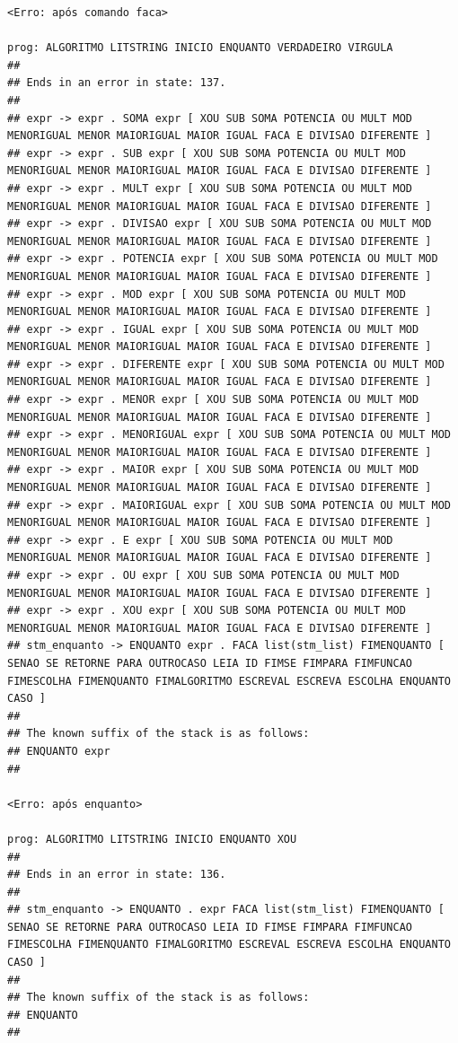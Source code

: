 \documentclass[hidelinks,12pt]{article}
\begin{document}
\begin{lstlisting}
<Erro: após comando faca>

prog: ALGORITMO LITSTRING INICIO ENQUANTO VERDADEIRO VIRGULA 
##
## Ends in an error in state: 137.
##
## expr -> expr . SOMA expr [ XOU SUB SOMA POTENCIA OU MULT MOD MENORIGUAL MENOR MAIORIGUAL MAIOR IGUAL FACA E DIVISAO DIFERENTE ]
## expr -> expr . SUB expr [ XOU SUB SOMA POTENCIA OU MULT MOD MENORIGUAL MENOR MAIORIGUAL MAIOR IGUAL FACA E DIVISAO DIFERENTE ]
## expr -> expr . MULT expr [ XOU SUB SOMA POTENCIA OU MULT MOD MENORIGUAL MENOR MAIORIGUAL MAIOR IGUAL FACA E DIVISAO DIFERENTE ]
## expr -> expr . DIVISAO expr [ XOU SUB SOMA POTENCIA OU MULT MOD MENORIGUAL MENOR MAIORIGUAL MAIOR IGUAL FACA E DIVISAO DIFERENTE ]
## expr -> expr . POTENCIA expr [ XOU SUB SOMA POTENCIA OU MULT MOD MENORIGUAL MENOR MAIORIGUAL MAIOR IGUAL FACA E DIVISAO DIFERENTE ]
## expr -> expr . MOD expr [ XOU SUB SOMA POTENCIA OU MULT MOD MENORIGUAL MENOR MAIORIGUAL MAIOR IGUAL FACA E DIVISAO DIFERENTE ]
## expr -> expr . IGUAL expr [ XOU SUB SOMA POTENCIA OU MULT MOD MENORIGUAL MENOR MAIORIGUAL MAIOR IGUAL FACA E DIVISAO DIFERENTE ]
## expr -> expr . DIFERENTE expr [ XOU SUB SOMA POTENCIA OU MULT MOD MENORIGUAL MENOR MAIORIGUAL MAIOR IGUAL FACA E DIVISAO DIFERENTE ]
## expr -> expr . MENOR expr [ XOU SUB SOMA POTENCIA OU MULT MOD MENORIGUAL MENOR MAIORIGUAL MAIOR IGUAL FACA E DIVISAO DIFERENTE ]
## expr -> expr . MENORIGUAL expr [ XOU SUB SOMA POTENCIA OU MULT MOD MENORIGUAL MENOR MAIORIGUAL MAIOR IGUAL FACA E DIVISAO DIFERENTE ]
## expr -> expr . MAIOR expr [ XOU SUB SOMA POTENCIA OU MULT MOD MENORIGUAL MENOR MAIORIGUAL MAIOR IGUAL FACA E DIVISAO DIFERENTE ]
## expr -> expr . MAIORIGUAL expr [ XOU SUB SOMA POTENCIA OU MULT MOD MENORIGUAL MENOR MAIORIGUAL MAIOR IGUAL FACA E DIVISAO DIFERENTE ]
## expr -> expr . E expr [ XOU SUB SOMA POTENCIA OU MULT MOD MENORIGUAL MENOR MAIORIGUAL MAIOR IGUAL FACA E DIVISAO DIFERENTE ]
## expr -> expr . OU expr [ XOU SUB SOMA POTENCIA OU MULT MOD MENORIGUAL MENOR MAIORIGUAL MAIOR IGUAL FACA E DIVISAO DIFERENTE ]
## expr -> expr . XOU expr [ XOU SUB SOMA POTENCIA OU MULT MOD MENORIGUAL MENOR MAIORIGUAL MAIOR IGUAL FACA E DIVISAO DIFERENTE ]
## stm_enquanto -> ENQUANTO expr . FACA list(stm_list) FIMENQUANTO [ SENAO SE RETORNE PARA OUTROCASO LEIA ID FIMSE FIMPARA FIMFUNCAO FIMESCOLHA FIMENQUANTO FIMALGORITMO ESCREVAL ESCREVA ESCOLHA ENQUANTO CASO ]
##
## The known suffix of the stack is as follows:
## ENQUANTO expr 
##

<Erro: após enquanto>

prog: ALGORITMO LITSTRING INICIO ENQUANTO XOU 
##
## Ends in an error in state: 136.
##
## stm_enquanto -> ENQUANTO . expr FACA list(stm_list) FIMENQUANTO [ SENAO SE RETORNE PARA OUTROCASO LEIA ID FIMSE FIMPARA FIMFUNCAO FIMESCOLHA FIMENQUANTO FIMALGORITMO ESCREVAL ESCREVA ESCOLHA ENQUANTO CASO ]
##
## The known suffix of the stack is as follows:
## ENQUANTO 
##


\end{lstlisting}
\end{document}
